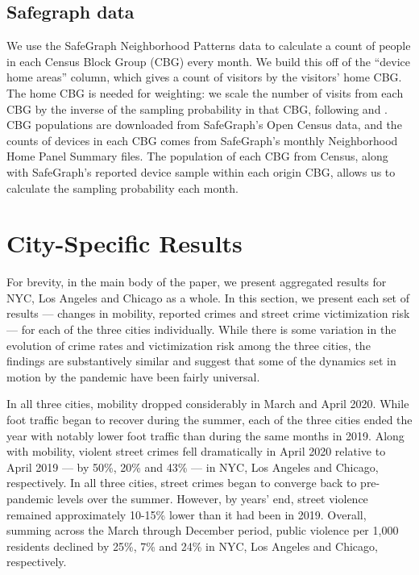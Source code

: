 \subsection{Safegraph data}
We use the SafeGraph Neighborhood Patterns data \citep{sg_neighb} to calculate a count of people in each Census Block Group (CBG) every month. We build this off of the ``device home areas'' column, which gives a count of visitors by the visitors' home CBG. The home CBG is needed for weighting: we scale the number of visits from each CBG by the inverse of the sampling probability in that CBG, following \citet{van2020using} and \citet{sg_scale}. CBG populations are downloaded from SafeGraph's Open Census data, and the counts of devices in each CBG comes from SafeGraph's monthly Neighborhood Home Panel Summary files. The population of each CBG from Census, along with SafeGraph's reported device sample within each origin CBG, allows us to calculate the sampling probability each month.


\clearpage
\newpage 
\section{City-Specific Results} \label{sec:appendix2}
For brevity, in the main body of the paper, we present aggregated results for NYC, Los Angeles and Chicago as a whole. In this section, we present each set of results --- changes in mobility, reported crimes and street crime victimization risk --- for each of the three cities individually. While there is some variation in the evolution of crime rates and victimization risk among the three cities, the findings are substantively similar and suggest that some of the dynamics set in motion by the pandemic have been fairly universal.

In all three cities, mobility dropped considerably in March and April 2020. While foot traffic began to recover during the summer, each of the three cities ended the year with notably lower foot traffic than during the same months in 2019. Along with mobility, violent street crimes fell dramatically in April 2020 relative to April 2019 --- by 50\%, 20\% and 43\% --- in NYC, Los Angeles and Chicago, respectively. In all three cities, street crimes began to converge back to pre-pandemic levels over the summer.  However, by years' end, street violence remained approximately 10-15\% lower than it had been in 2019. Overall, summing across the March through December period,  public violence per 1,000 residents declined by 25\%, 7\% and 24\% in NYC, Los Angeles and Chicago, respectively.

